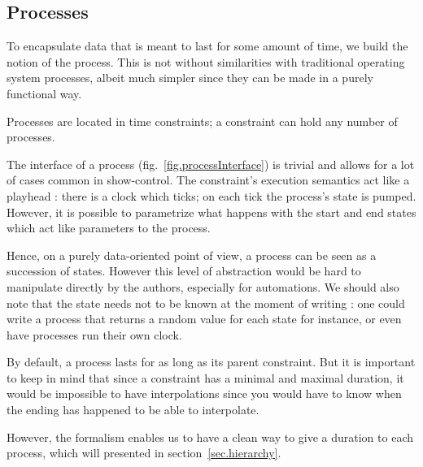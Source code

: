 \documentclass{sigchi}
\begin{document}
\subsection{Processes}
To encapsulate data that is meant to last for some amount of time, we build the notion of the process. This is not without similarities with traditional operating system processes, albeit much simpler since they can be made in a purely functional way.

Processes are located in time constraints; a constraint can hold any number of processes.

The interface of a process (fig.~\ref{fig.processInterface}) is trivial and allows for a lot of cases common in show-control. The constraint's execution semantics act like a playhead : there is a clock which ticks; on each tick the process's state is pumped. However, it is possible to parametrize what happens with the start and end states which act like parameters to the process. 

Hence, on a purely data-oriented point of view, a process can be seen as a succession of states. However this level of abstraction would be hard to manipulate directly by the authors, especially for automations. We should also note that the state needs not to be known at the moment of writing : one could write a process that returns a random value for each state for instance, or even have processes run their own clock.


By default, a process lasts for as long as its parent constraint. But it is important to keep in mind that since a constraint has a minimal and maximal duration, it would be impossible to have interpolations since you would have to know when the ending has happened to be able to interpolate. 

However, the formalism enables us to have a clean way to give a duration to each process, which will presented in section~\ref{sec.hierarchy}.
\end{document}
